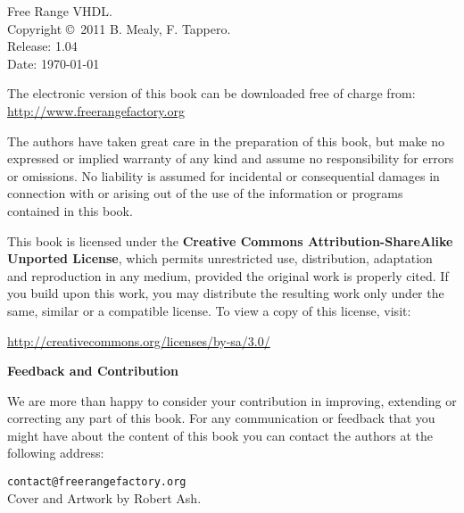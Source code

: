 %
%
%
\setcounter{page}{1}

\small
\noindent
Free Range VHDL.\\
Copyright \copyright \ 2011 B. Mealy, F. Tappero.\\
Release: 1.04\\
Date: \today
\vspace{20pt}

\noindent
The electronic version of this book can be downloaded free of charge from:\\ 
\url{http://www.freerangefactory.org}\\

\vspace{20pt}

\noindent
The authors have taken great care in the preparation of this book, but make no expressed or implied warranty of any kind and assume no responsibility for errors or omissions. No liability is assumed for incidental or consequential damages in connection with or arising out of the use of the information or programs contained in this book.

\noindent
This book is licensed under the \textbf{Creative Commons Attribution-ShareAlike Unported License}, which permits unrestricted use, distribution, adaptation and reproduction in any medium, provided the original work is properly cited. If you build upon this work, you may distribute the resulting work only under the same, similar or a compatible license. To view a copy of this license, visit:
\vspace{5pt}

\noindent
\url{http://creativecommons.org/licenses/by-sa/3.0/}
\vspace{20pt}

\noindent
{\sffamily\bfseries Feedback and Contribution}

\noindent
We are more than happy to consider your contribution in improving, extending or correcting any part of this book.
For any communication or feedback that you might have about the content of this book you can contact the authors at the following address:
\vspace{2pt}

\noindent
\texttt{contact@freerangefactory.org}\\

\vfill
\noindent
Cover and Artwork by Robert Ash.


